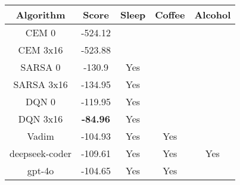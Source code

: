 \begin{tabular}{c|c|c|c|c}
    Algorithm & Score & Sleep & Coffee & Alcohol \\
    \midrule
    CEM 0 & -524.12 &  & & \\
    CEM 3x16 & -523.88 & & & \\
    SARSA 0 & -130.9 & Yes & & \\
    SARSA 3x16 & -134.95 & Yes & & \\
    DQN 0 & -119.95 & Yes & & \\
    DQN 3x16 & \textbf{-84.96} & Yes & & \\
    Vadim & -104.93 & Yes & Yes & \\
    deepseek-coder & -109.61 & Yes & Yes & Yes \\
    gpt-4o & -104.65 & Yes & Yes & \\
\end{tabular}
